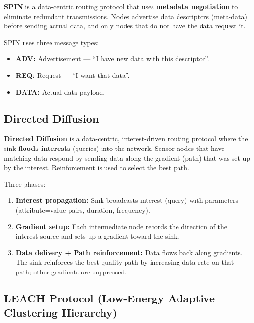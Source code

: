 \documentclass[12pt,a4paper]{article}
\begin{document}
\begin{tcolorbox}[defbox, title={\textbf{SPIN --- Definition}}]
\textbf{SPIN} is a data-centric routing protocol that uses \textbf{metadata negotiation} to eliminate redundant transmissions. Nodes advertise data descriptors (meta-data) before sending actual data, and only nodes that do not have the data request it.
\end{tcolorbox}

SPIN uses three message types:
\begin{itemize}[leftmargin=*, itemsep=2pt]
  \item \textbf{ADV:} Advertisement --- ``I have new data with this descriptor''.
  \item \textbf{REQ:} Request --- ``I want that data''.
  \item \textbf{DATA:} Actual data payload.
\end{itemize}

\subsection{Directed Diffusion}

\begin{tcolorbox}[defbox, title={\textbf{Directed Diffusion --- Definition}}]
\textbf{Directed Diffusion} is a data-centric, interest-driven routing protocol where the sink \textbf{floods interests} (queries) into the network. Sensor nodes that have matching data respond by sending data along the gradient (path) that was set up by the interest. Reinforcement is used to select the best path.
\end{tcolorbox}

Three phases:
\begin{enumerate}[leftmargin=*, itemsep=3pt]
  \item \textbf{Interest propagation:} Sink broadcasts interest (query) with parameters (attribute=value pairs, duration, frequency).
  \item \textbf{Gradient setup:} Each intermediate node records the direction of the interest source and sets up a gradient toward the sink.
  \item \textbf{Data delivery + Path reinforcement:} Data flows back along gradients. The sink reinforces the best-quality path by increasing data rate on that path; other gradients are suppressed.
\end{enumerate}

\subsection{LEACH Protocol (Low-Energy Adaptive Clustering Hierarchy)}
\end{document}
